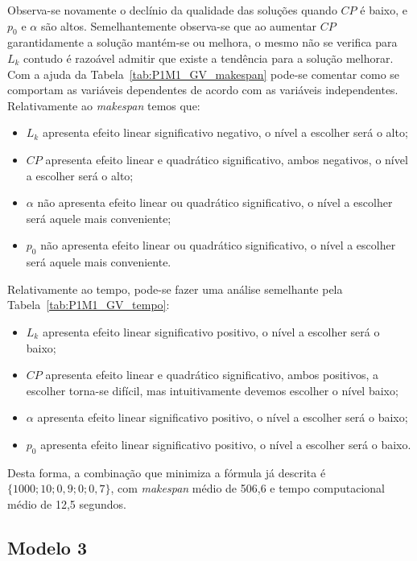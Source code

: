 Observa-se novamente o declínio da qualidade das soluções quando $CP$ é baixo, e $p_{0}$ e $\alpha$ são altos. Semelhantemente observa-se que ao aumentar $CP$ garantidamente a solução mantém-se ou melhora, o mesmo não se verifica para $L_{k}$ contudo é razoável admitir que existe a tendência para a solução melhorar.\\
Com a ajuda da Tabela~\ref{tab:P1M1_GV_makespan} pode-se comentar como se comportam as variáveis dependentes de acordo com as variáveis independentes. Relativamente ao \textit{makespan} temos que:
\begin{itemize}
\item $L_{k}$ apresenta efeito linear significativo negativo, o nível a escolher será o alto;
\item $CP$ apresenta efeito linear e quadrático significativo, ambos negativos, o nível a escolher será o alto;
\item $\alpha$ não apresenta efeito linear ou quadrático significativo, o nível a escolher será aquele mais conveniente;
\item $p_{0}$ não apresenta efeito linear ou quadrático significativo, o nível a escolher será aquele mais conveniente.
\end{itemize}
Relativamente ao tempo, pode-se fazer uma análise semelhante pela Tabela~\ref{tab:P1M1_GV_tempo}:
\begin{itemize}
\item $L_{k}$ apresenta efeito linear significativo positivo, o nível a escolher será o baixo;
\item $CP$ apresenta efeito linear e quadrático significativo, ambos positivos, a escolher torna-se difícil, mas intuitivamente devemos escolher o nível baixo;
\item $\alpha$ apresenta efeito linear significativo positivo, o nível a escolher será o baixo;
\item $p_{0}$ apresenta efeito linear significativo positivo, o nível a escolher será o baixo.
\end{itemize}

Desta forma, a combinação que minimiza a fórmula já descrita é $\{1000; 10; 0,9; 0; 0,7\}$, com \textit{makespan} médio de 506,6 e tempo computacional médio de 12,5 segundos.\\

\subsection{Modelo 3}


